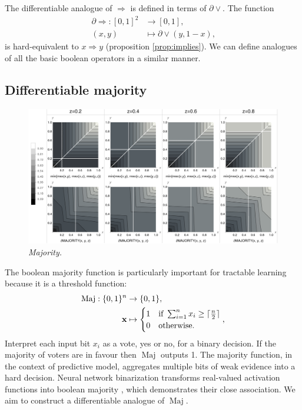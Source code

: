 \documentclass{article} %
\begin{document}
The differentiable analogue of $\Rightarrow$ is defined in terms of $\partial\vee$. The function
\begin{equation*}
\begin{aligned}
\partial\!\Rightarrow: [0,1]^{2} &\to [0,1],\\
(x, y) &\mapsto \partial\!\vee\!(y, 1-x)\text{,}
\end{aligned}
\end{equation*}
is hard-equivalent to $x \Rightarrow y$ (proposition \ref{prop:implies}). We can define  analogues of all the basic boolean operators in a similar manner.

\subsection{Differentiable majority}

\begin{figure}[t]
	\centering
	\includegraphics[trim=0pt 0pt 0pt 0pt, clip, width=1.0\textwidth]{majority-gates.png}
	\caption{{\em Majority.}} 
	\label{fig:majority-plot}
\end{figure}

The boolean majority function is particularly important for tractable learning because it is a threshold function:
\begin{equation*}
\begin{aligned}
\operatorname{Maj}: \{0,1\}^{n} &\to \{0,1\},\\
{\bf x} &\mapsto 
	\begin{cases}
	1 &\text{if }\sum_{i=1}^n x_i \geq \lceil \frac{n}{2} \rceil\\
	0 &\text{otherwise.}
	\end{cases}
\text{,}
\end{aligned}
\end{equation*}
Interpret each input bit $x_{i}$ as a vote, yes or no, for a binary decision. If the majority of voters are in favour then $\operatorname{Maj}$ outputs 1. The majority function, in the context of predictive model, aggregates multiple bits of weak evidence into a hard decision. Neural network binarization transforms real-valued activation functions into boolean majority \citep{10.5555/3157382.3157557}, which demonstrates their close association. We aim to construct a differentiable analogue of $\operatorname{Maj}$.
\end{document}
